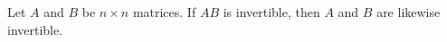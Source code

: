 %
%


\begin{Cor}\label{cor:nonsingularthm} Let $A$ and $B$ be $n\times n$ matrices. If $AB$ is invertible, then $A$ and $B$ are likewise invertible.\\
\end{Cor}



